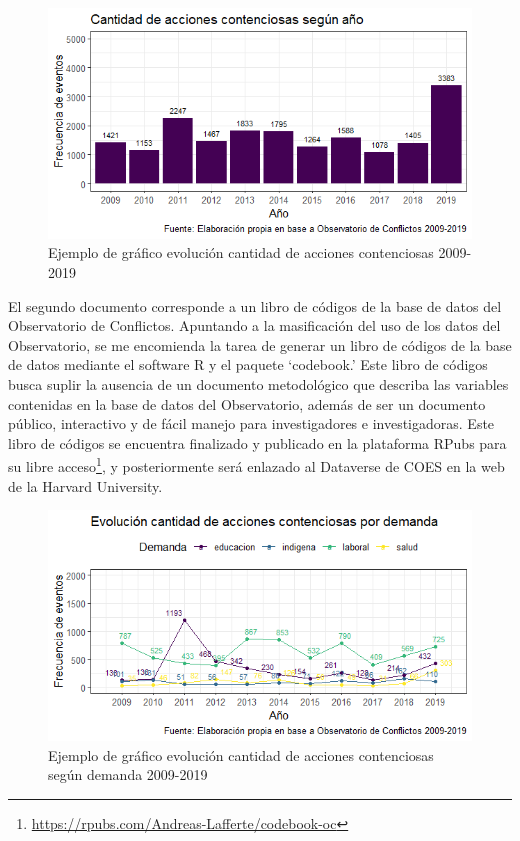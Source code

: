 \documentclass[
  12pt,
]{article}
\begin{document}
\begin{figure}[!ht]

{\centering \includegraphics[width=0.9\linewidth,]{plot1} 

}

\caption{Ejemplo de gráfico evolución cantidad de acciones contenciosas 2009-2019}\label{fig:fig4}
\end{figure}

El segundo documento corresponde a un libro de códigos de la base de
datos del Observatorio de Conflictos. Apuntando a la masificación del
uso de los datos del Observatorio, se me encomienda la tarea de generar
un libro de códigos de la base de datos mediante el software R y el
paquete `codebook.' Este libro de códigos busca suplir la ausencia de un
documento metodológico que describa las variables contenidas en la base
de datos del Observatorio, además de ser un documento público,
interactivo y de fácil manejo para investigadores e investigadoras. Este
libro de códigos se encuentra finalizado y publicado en la plataforma
RPubs para su libre acceso\footnote{\url{https://rpubs.com/Andreas-Lafferte/codebook-oc}},
y posteriormente será enlazado al Dataverse de COES en la web de la
Harvard University.

\begin{figure}[!ht]

{\centering \includegraphics[width=0.9\linewidth,]{plot2} 

}

\caption{Ejemplo de gráfico evolución cantidad de acciones contenciosas según demanda 2009-2019}\label{fig:fig5}
\end{figure}
\end{document}
